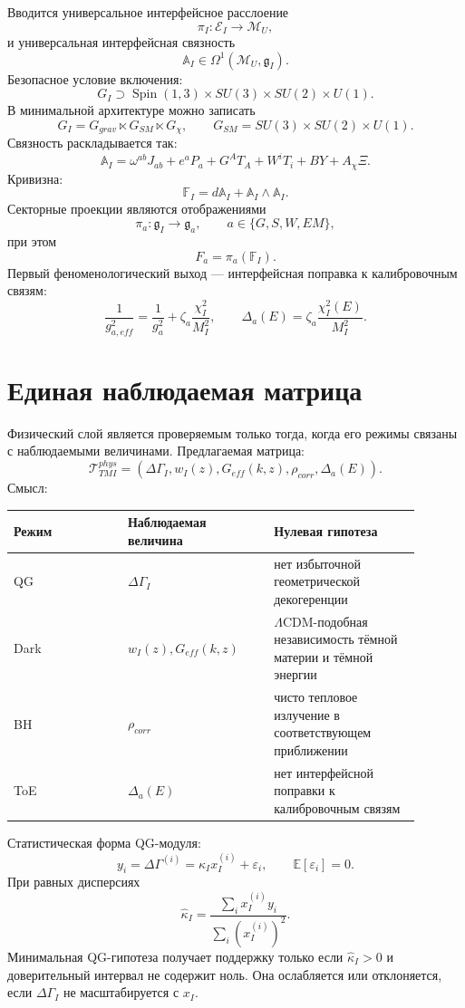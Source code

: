 \documentclass[12pt,a4paper]{article}
\DeclareMathOperator{\Spin}{Spin}
\newcommand{\M}{\mathcal M_U}
\newcommand{\Acal}{\mathbb A_I}
\newcommand{\Fcal}{\mathbb F_I}
\newcommand{\eps}{\varepsilon}
\begin{document}
Вводится универсальное интерфейсное расслоение
\[
\boxed{\pi_I:\mathcal E_I\to\M,}
\]
и универсальная интерфейсная связность
\[
\boxed{\Acal\in\Omega^1(\M,\mathfrak g_I).}
\]
Безопасное условие включения:
\[
\boxed{G_I\supset \Spin(1,3)\times SU(3)\times SU(2)\times U(1).}
\]
В минимальной архитектуре можно записать
\[
\boxed{
G_I=G_{grav}\ltimes G_{SM}\ltimes G_\chi,
\qquad
G_{SM}=SU(3)\times SU(2)\times U(1).
}
\]
Связность раскладывается так:
\[
\boxed{
\Acal=\omega^{ab}J_{ab}+e^aP_a+G^AT_A+W^iT_i+BY+A_\chi\Xi.
}
\]
Кривизна:
\[
\boxed{\Fcal=d\Acal+\Acal\wedge\Acal.}
\]
Секторные проекции являются отображениями
\[
\boxed{\pi_a:\mathfrak g_I\to\mathfrak g_a,
\qquad a\in\{G,S,W,EM\},}
\]
при этом
\[
\boxed{F_a=\pi_a(\Fcal).}
\]
Первый феноменологический выход — интерфейсная поправка к калибровочным связям:
\[
\boxed{
\frac{1}{g_{a,eff}^2}=\frac{1}{g_a^2}+\zeta_a\frac{\chi_I^2}{M_I^2},
\qquad
\Delta_a(E)=\zeta_a\frac{\chi_I^2(E)}{M_I^2}.
}
\]

\section{Единая наблюдаемая матрица}
Физический слой является проверяемым только тогда, когда его режимы связаны с наблюдаемыми величинами. Предлагаемая матрица:
\[
\boxed{
\mathcal T_{TMI}^{phys}
=
\left(
\Delta\Gamma_I,
 w_I(z),
 G_{eff}(k,z),
 \rho_{corr},
 \Delta_a(E)
\right).
}
\]
Смысл:
\begin{longtable}{p{0.25\linewidth}p{0.32\linewidth}p{0.32\linewidth}}
\toprule
Режим & Наблюдаемая величина & Нулевая гипотеза \\
\midrule
QG & $\Delta\Gamma_I$ & нет избыточной геометрической декогеренции \\
Dark & $w_I(z),G_{eff}(k,z)$ & $\Lambda$CDM-подобная независимость тёмной материи и тёмной энергии \\
BH & $\rho_{corr}$ & чисто тепловое излучение в соответствующем приближении \\
ToE & $\Delta_a(E)$ & нет интерфейсной поправки к калибровочным связям \\
\bottomrule
\end{longtable}

Статистическая форма QG-модуля:
\[
\boxed{
y_i=\Delta\Gamma^{(i)}=\kappa_Ix_I^{(i)}+\eps_i,
\qquad
\mathbb E[\eps_i]=0.
}
\]
При равных дисперсиях
\[
\boxed{
\widehat\kappa_I=\frac{\sum_i x_I^{(i)}y_i}{\sum_i(x_I^{(i)})^2}.
}
\]
Минимальная QG-гипотеза получает поддержку только если $\widehat\kappa_I>0$ и доверительный интервал не содержит ноль. Она ослабляется или отклоняется, если $\Delta\Gamma_I$ не масштабируется с $x_I$.
\end{document}
